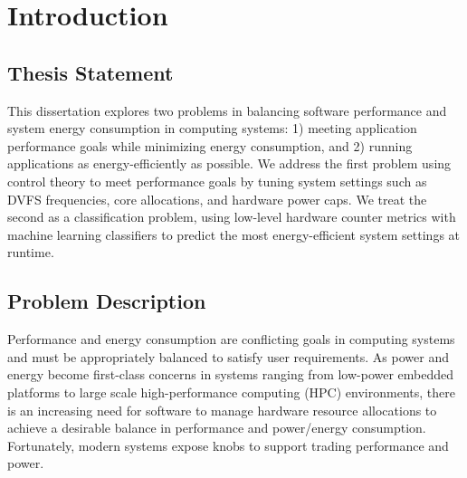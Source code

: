 \chapter{Introduction}
\label{sec:intro}

\section{Thesis Statement}

This dissertation explores two problems in balancing software performance and system energy consumption in computing systems: 1) meeting application performance goals while minimizing energy consumption, and 2) running applications as energy-efficiently as possible.
We address the first problem using control theory to meet performance goals by tuning system settings such as DVFS frequencies, core allocations, and hardware power caps.
We treat the second as a classification problem, using low-level hardware counter metrics with machine learning classifiers to predict the most energy-efficient system settings at runtime.


\section{Problem Description}
\label{sec:intro-description}

Performance and energy consumption are conflicting goals in computing systems and must be appropriately balanced to satisfy user requirements.
As power and energy become first-class concerns in systems ranging from low-power embedded platforms to large scale high-performance computing (HPC) environments, there is an increasing need for software to manage hardware resource allocations to achieve a desirable balance in performance and power/energy consumption.
Fortunately, modern systems expose knobs to support trading performance and power.

